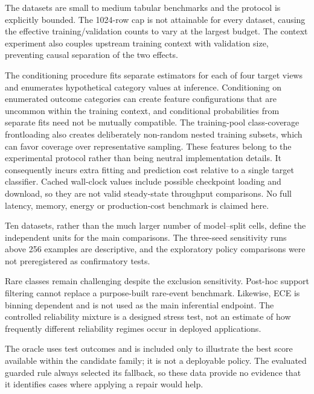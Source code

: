 \documentclass[a4paper,fleqn]{cas-sc}
\begin{document}
The datasets are small to medium tabular benchmarks and the protocol is explicitly bounded. The 1024-row cap is not attainable for every dataset, causing the effective training/validation counts to vary at the largest budget. The context experiment also couples upstream training context with validation size, preventing causal separation of the two effects.

The conditioning procedure fits separate estimators for each of four target views and enumerates hypothetical category values at inference. Conditioning on enumerated outcome categories can create feature configurations that are uncommon within the training context, and conditional probabilities from separate fits need not be mutually compatible. The training-pool class-coverage frontloading also creates deliberately non-random nested training subsets, which can favor coverage over representative sampling. These features belong to the experimental protocol rather than being neutral implementation details. It consequently incurs extra fitting and prediction cost relative to a single target classifier. Cached wall-clock values include possible checkpoint loading and download, so they are not valid steady-state throughput comparisons. No full latency, memory, energy or production-cost benchmark is claimed here.

Ten datasets, rather than the much larger number of model--split cells, define the independent units for the main comparisons. The three-seed sensitivity runs above 256 examples are descriptive, and the exploratory policy comparisons were not preregistered as confirmatory tests.

Rare classes remain challenging despite the exclusion sensitivity. Post-hoc support filtering cannot replace a purpose-built rare-event benchmark. Likewise, ECE is binning dependent and is not used as the main inferential endpoint. The controlled reliability mixture is a designed stress test, not an estimate of how frequently different reliability regimes occur in deployed applications.

The oracle uses test outcomes and is included only to illustrate the best score available within the candidate family; it is not a deployable policy. The evaluated guarded rule always selected its fallback, so these data provide no evidence that it identifies cases where applying a repair would help.
\end{document}
